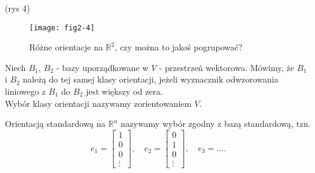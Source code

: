 \documentclass[../main.tex]{subfiles}
\begin{document}
(rys 4)
\begin{figure}[h]
    \centering
    \texttt{[image: fig2-4]}
    \caption{Różne orientacje na $\mathbb{R}^2$, czy można to jakoś pogrupować?}
    \label{fig:fig2-4}
\end{figure}
\begin{definicja}
    Niech $B_1$, $B_2$ - bazy uporządkowane w $V$ - przestrzeń wektorowa. Mówimy, że $B_1$ i $B_2$ należą do tej samej klasy orientacji, jeżeli wyznacznik odwzorowania liniowego z $B_1$ do $B_2$ jest większy od zera.\\
    Wybór klasy orientacji nazywamy zorientowaniem $V$.
\end{definicja}
\begin{definicja}
    Orientacją standardową na $\mathbb{R}^n$ nazywamy wybór zgodny z bazą standardową, tzn.
    \[
        e_1 = \begin{bmatrix} 1\\0\\0\\ \vdots \end{bmatrix},\quad e_2 = \begin{bmatrix} 0\\1\\0\\ \vdots \end{bmatrix},\quad e_3 = \ldots
    .\]
\end{definicja}
\end{document}
